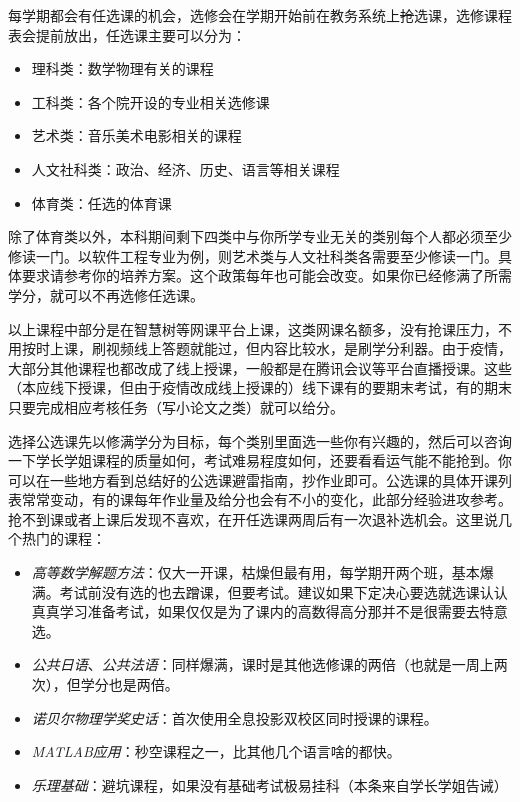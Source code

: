 
每学期都会有任选课的机会，选修会在学期开始前在教务系统上\sout{抢}选课，选修课程表会提前放出，任选课主要可以分为：
\begin{itemize}
    \itshape
    \item 理科类：数学物理有关的课程
    \item 工科类：各个院开设的专业相关选修课
    \item 艺术类：音乐美术电影相关的课程
    \item 人文社科类：政治、经济、历史、语言等相关课程
    \item 体育类：任选的体育课
\end{itemize}

除了体育类以外，本科期间剩下四类中与你所学专业无关的类别每个人都必须至少修读一门。以软件工程专业为例，则艺术类与人文社科类各需要至少修读一门。具体要求请参考你的培养方案。这个政策每年也可能会改变。如果你已经修满了所需学分，就可以不再选修任选课。

以上课程中部分是在智慧树等网课平台上课，这类网课名额多，没有抢课压力，不用按时上课，刷视频线上答题就能过，但内容比较水，是刷学分利器。由于疫情，大部分其他课程也都改成了线上授课，一般都是在腾讯会议等平台直播授课。这些（本应线下授课，但由于疫情改成线上授课的）线下课有的要期末考试，有的期末只要完成相应考核任务（写小论文之类）就可以给分。

选择公选课先以修满学分为目标，每个类别里面选一些你有兴趣的，然后可以咨询一下学长学姐课程的质量如何，考试难易程度如何，还要看看运气能不能抢到。你可以在一些地方看到总结好的公选课避雷指南，抄作业即可。公选课的具体开课列表常常变动，有的课每年作业量及给分也会有不小的变化，此部分经验进攻参考。抢不到课或者上课后发现不喜欢，在开任选课两周后有一次退补选机会。这里说几个热门的课程：

\begin{itemize}
    \itshape
    \item \emph{高等数学解题方法}：仅大一开课，枯燥但最有用，每学期开两个班，基本爆满。考试前没有选的也去蹭课，但要考试。建议如果下定决心要选就选课认认真真学习准备考试，如果仅仅是为了课内的高数得高分那并不是很需要去特意选。
    \item \emph{公共日语}、\emph{公共法语}：同样爆满，课时是其他选修课的两倍（也就是一周上两次），但学分也是两倍。
    \item \emph{诺贝尔物理学奖史话}：首次使用全息投影双校区同时授课的课程。
    \item \emph{MATLAB应用}：秒空课程之一，比其他几个语言啥的都快。
    \item \emph{乐理基础}：避坑课程，如果没有基础考试极易挂科（本条来自学长学姐告诫）
\end{itemize}

